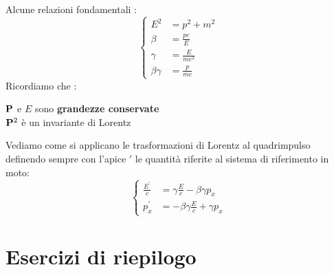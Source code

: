 \begin{tcolorbox}[colback=red!5!white,colframe=red!50!black,title=ATTENZIONE !]
Alcune relazioni fondamentali : 
\begin{equation*}
        \left\{\begin{aligned}
        E^2 &= \textit{p}^2 + m^2\\
        \beta &=\frac{\textit{p}c}{E}\\ 
        \gamma &= \frac{E}{mc^2} \\
        \beta\gamma &= \frac{p}{mc}
\end{aligned}
\right.
\end{equation*}
Ricordiamo che : 
\begin{center} $\vb{P}$ e $E$ sono \textbf{grandezze conservate} \\ $\vb{P}^2$ è un invariante di Lorentz\end{center}
\end{tcolorbox}
Vediamo come si applicano le trasformazioni di Lorentz al quadrimpulso definendo sempre con l'apice $\prime$ le quantità 
riferite al sistema di riferimento in moto: 
\begin{equation*}
        \left\{\begin{aligned} 
                \frac{E^{\prime}}{c} &= \gamma\frac{E}{c} - \beta\gamma\textit{p}_{x} \\
                \textit{p}^{\prime}_{x} &= -\beta\gamma\frac{E}{c} + \gamma\textit{p}_{x}
        \end{aligned}
\right.
\end{equation*}
\section{Esercizi di riepilogo}
